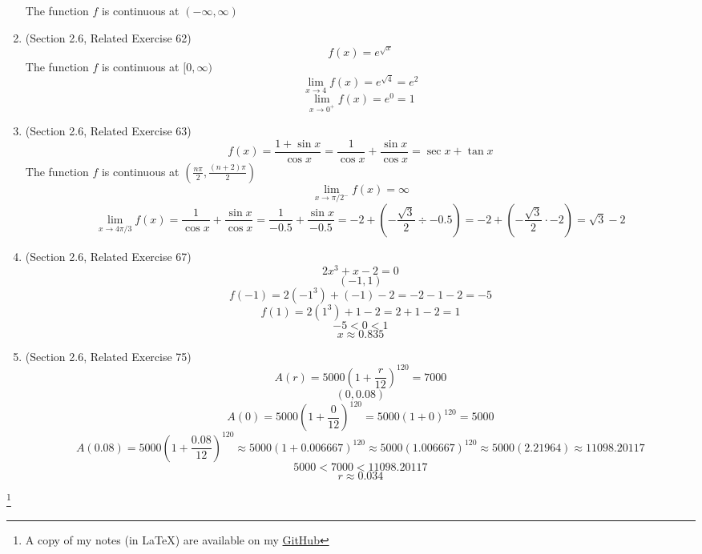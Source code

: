 \documentclass{article}
\newcommand\blfootnote[1]{
    \begingroup
    \renewcommand\thefootnote{}\footnote{#1}
    \addtocounter{footnote}{-1}
    \endgroup
}
\begin{document}
\begin{enumerate}
		The function $f$ is continuous at $(- \infty, \infty)$
	\item (Section 2.6, Related Exercise 62)
		$$f(x) = e^{\sqrt{x}}$$
		The function $f$ is continuous at $[0, \infty)$
		$$\lim_{x \to 4}{f(x)} = e^{\sqrt{4}} = e^2$$
		$$\lim_{x \to 0^+}{f(x)} = e^0 = 1$$
	\item (Section 2.6, Related Exercise 63)
		$$f(x) = \frac{1 + \sin{x}}{\cos{x}} = \frac{1}{\cos{x}} + \frac{\sin{x}}{\cos{x}} = \sec{x} + \tan{x}$$
		The function $f$ is continuous at $\left (\frac{n \pi}{2}, \frac{\left (n + 2 \right ) \pi}{2} \right )$
		$$\lim_{x \to \pi/2^-}{f(x)} = \infty$$
		$$\lim_{x \to 4 \pi/3}{f(x)} = \frac{1}{\cos{x}} + \frac{\sin{x}}{\cos{x}} = \frac{1}{-0.5} + \frac{\sin{x}}{-0.5} = -2 + \left (- \frac{\sqrt{3}}{2} \div -0.5 \right ) = -2 + \left (- \frac{\sqrt{3}}{2} \cdot -2 \right ) = \sqrt{3} - 2$$
	\item (Section 2.6, Related Exercise 67)
		$$2x^3 + x - 2 = 0$$
		$$(-1, 1)$$
		$$f(-1) = 2(-1^3) + (-1) - 2 = -2 - 1 - 2 = -5$$
		$$f(1) = 2(1^3) + 1 - 2 = 2 + 1 - 2 = 1$$
		$$-5 < 0 < 1$$
		$$x \approx 0.835$$
	\item (Section 2.6, Related Exercise 75)
		$$A(r) = 5000 \left (1 + \frac{r}{12} \right )^{120} = 7000$$
		$$(0, 0.08)$$
		$$A(0) = 5000 \left (1 + \frac{0}{12} \right )^{120} = 5000(1 + 0)^{120} = 5000$$
		$$A(0.08) = 5000 \left (1 + \frac{0.08}{12} \right )^{120} \approx 5000(1 + 0.006667)^{120} \approx 5000(1.006667)^{120} \approx 5000(2.21964) \approx 11098.20117$$
		$$5000 < 7000 < 11098.20117$$
		$$r \approx 0.034$$
\end{enumerate}
\blfootnote{A copy of my notes (in \LaTeX) are available on my \href{https://github.com/onlinechronically/MATH-211}{GitHub}}
\end{document}
